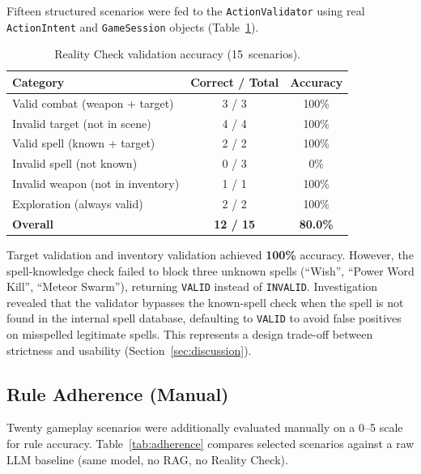 \documentclass[12pt,a4paper]{article}
\begin{document}
Fifteen structured scenarios were fed to the \texttt{ActionValidator} using
real \texttt{ActionIntent} and \texttt{GameSession} objects
(Table~\ref{tab:reality_eval}).

\begin{table}[H]
\centering
\caption{Reality Check validation accuracy (15~scenarios).}
\label{tab:reality_eval}
\small
\begin{tabular}{lcc}
\toprule
\textbf{Category} & \textbf{Correct / Total} & \textbf{Accuracy} \\
\midrule
Valid combat (weapon + target)   & 3 / 3 & 100\% \\
Invalid target (not in scene)    & 4 / 4 & 100\% \\
Valid spell (known + target)     & 2 / 2 & 100\% \\
Invalid spell (not known)        & 0 / 3 & 0\% \\
Invalid weapon (not in inventory)& 1 / 1 & 100\% \\
Exploration (always valid)       & 2 / 2 & 100\% \\
\midrule
\textbf{Overall} & \textbf{12 / 15} & \textbf{80.0\%} \\
\bottomrule
\end{tabular}
\end{table}

Target validation and inventory validation achieved \textbf{100\%} accuracy.
However, the spell-knowledge check failed to block three unknown spells
(``Wish'', ``Power Word Kill'', ``Meteor Swarm''), returning \texttt{VALID}
instead of \texttt{INVALID}. Investigation revealed that the validator
bypasses the known-spell check when the spell is not found in the internal
spell database, defaulting to \texttt{VALID} to avoid false positives on
misspelled legitimate spells. This represents a design trade-off between
strictness and usability (Section~\ref{sec:discussion}).

\subsection{Rule Adherence (Manual)}
\label{sec:ruleadherence}

Twenty gameplay scenarios were additionally evaluated manually on a 0--5
scale for rule accuracy. Table~\ref{tab:adherence} compares selected
scenarios against a raw LLM baseline (same model, no RAG, no Reality
Check).
\end{document}
